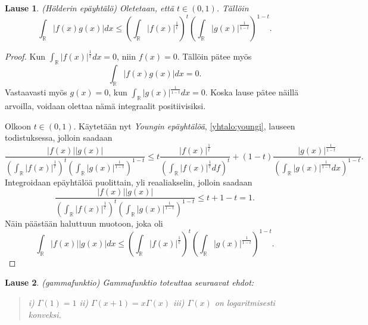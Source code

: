 \documentclass[12pt]{article}
\theoremstyle{definition}
\theoremstyle{plain}
\newtheorem{lause}{Lause}
\numberwithin{equation}{section}
\begin{document}
\begin{lause} \label{lause: hölder}
(Hölderin epäyhtälö) Oletetaan, että $t \in (0,1)$. Tällöin 
\begin{equation}
    \int_{\mathbb{R}} |f(x)g(x)|dx \le \left( \int_{\mathbb{R}} |f(x)|^{\frac{1}{t}} \right)^{t}\left( \int_{\mathbb{R}} |g(x)|^{\frac{1}{1-t}}\right)^{1-t}.
\end{equation}
\end{lause}
\begin{proof}
Kun $\int_\mathbb{R}|f(x)|^{\frac{1}{t}}dx=0$,  niin $f(x)=0$. Tällöin pätee myös
\begin{equation}
    \int_{\mathbb{R}} |f(x)g(x)|dx=0.
\end{equation}
Vastaavasti myös $g(x)=0$, kun $\int_{\mathbb{R}}|g(x)|^{\frac{1}{1-t}}dx=0$. Koska lause pätee näillä arvoilla, voidaan olettaa nämä integraalit positiivisiksi.

Olkoon $t\in(0,1).$ Käytetään nyt \emph{Youngin epäyhtälöä}, \eqref{yhtalo:youngi}, lauseen todistuksessa, jolloin saadaan
\begin{equation*}
    \frac{|f(x)||g(x)|}{\left(\int_{\mathbb{R}}|f(x)|^{\frac{1}{t}}\right)^{t}\left(\int_{\mathbb{R}}|g(x)|^{\frac{1}{1-t}}\right)^{1-t}} \le t\frac{|f(x)|^{\frac{1}{t}}}{\left(\int_{\mathbb{R}}|f(x)|^{\frac{1}{t}}df\right)^{t}}+(1-t)\frac{|g(x)|^{\frac{1}{1-t}}}{\left(\int_{\mathbb{R}}|g(x)|^{\frac{1}{1-t}}dx\right)^{1-t}}.
\end{equation*}
Integroidaan epäyhtälöä puolittain, yli reaaliakselin, jolloin saadaan
\begin{equation*}
     \frac{|f(x)||g(x)|}{\left(\int_{\mathbb{R}}|f(x)|^{\frac{1}{t}}\right)^{t}\left(\int_{\mathbb{R}}|g(x)|^{\frac{1}{1-t}}\right)^{1-t}}\le t+1-t=1.
\end{equation*}
Näin päästään haluttuun muotoon, joka oli
\begin{equation*}
    \int_{\mathbb{R}} |f(x)||g(x)|dx \le \left( \int_{\mathbb{R}} |f(x)|^{\frac{1}{t}} \right)^{t}\left( \int_{\mathbb{R}} |g(x)|^{\frac{1}{1-t}}\right)^{1-t}.
\end{equation*}

\end{proof}

\begin{lause}
(gammafunktio) Gammafunktio  toteuttaa seuraavat ehdot:
\begin{quote}
    i) $\Gamma(1)=1$ \newline
    ii) $\Gamma(x+1)=x\Gamma(x)$ \newline
    iii) $\Gamma(x)$ on logaritmisesti konveksi.
\end{quote}
\end{lause}
\end{document}
